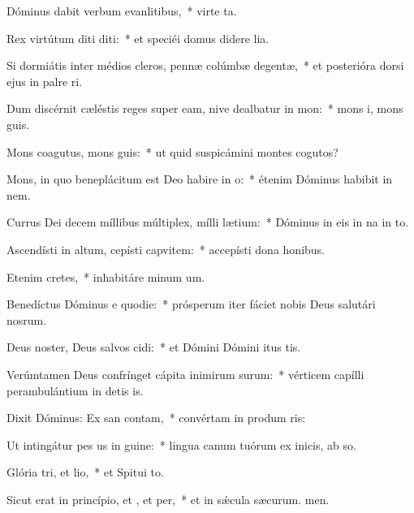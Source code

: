 \item Dóminus dabit verbum evanlitibus,~* virte ta.
\item Rex virtútum diti diti:~* et speciéi domus didere lia.
\item Si dormiátis inter médios cleros, pennæ colúmbæ degentæ,~* et posterióra dorsi ejus in palre ri.
\item Dum discérnit cæléstis reges super eam, nive dealbatur in mon:~* mons i, mons guis.
\item Mons coagutus, mons guis:~* ut quid suspicámini montes cogutos?
\item Mons, in quo beneplácitum est Deo habire in o:~* étenim Dóminus habibit in nem.
\item Currus Dei decem míllibus múltiplex, mílli lætium:~* Dóminus in eis in na in to.
\item Ascendísti in altum, cepísti capvitem:~* accepísti dona  honibus.
\item Etenim  cretes,~* inhabitáre minum um.
\item Benedíctus Dóminus e quodie:~* prósperum iter fáciet nobis Deus salutári nosrum.
\item Deus noster, Deus salvos cidi:~* et Dómini Dómini itus tis.
\item Verúmtamen Deus confrínget cápita inimirum surum:~* vérticem capílli perambulántium in detis is.
\item Dixit Dóminus: Ex san contam,~* convértam in produm ris:
\item Ut intingátur pes us in guine:~* lingua canum tuórum ex inicis, ab so.
\item Glória tri, et lio,~* et Spitui to.
\item Sicut erat in princípio, et , et per,~* et in sǽcula sæcurum. men.
